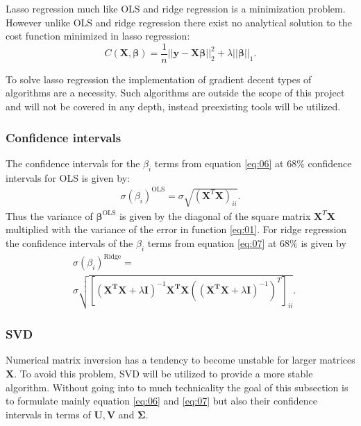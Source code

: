 \documentclass[uio,jmp,amsmath,amssymb,reprint,nofootinbib]{revtex4-1}
\numberwithin{equation}{section}
\newcommand{\lp}{\left(}
\newcommand{\rp}{\right)}
\newcommand{\lsb}{\left[}
\newcommand{\rsb}{\right]}
\begin{document}
Lasso regression much like OLS and ridge regression is a minimization problem. However unlike OLS and ridge regression there exist no analytical solution to the cost function minimized in lasso regression:
\begin{equation}
C(\boldsymbol{X},\boldsymbol{\beta})=\frac{1}{n}\vert\vert \boldsymbol{y}-\boldsymbol{X}\boldsymbol{\beta}\vert\vert_2^2+\lambda\vert\vert \boldsymbol{\beta}\vert\vert_1.
\end{equation}

To solve lasso regression the implementation of gradient decent types of algorithms are a necessity. Such algorithms are outside the scope of this project and will not be covered in any depth, instead preexisting tools will be utilized.

\subsubsection{Confidence intervals}

The confidence intervals for the \(\beta_i\) terms from equation \ref{eq:06} at \(68\%\) confidence intervals for OLS is given by:
\begin{align}\label{eq:12}
\sigma(\beta_i)^{\text{OLS}} = \sigma\sqrt{(\bm{X}^T\bm{X})_{ii}}.
\end{align}
Thus the variance of \(\bm{\beta}^{\text{OLS}}\) is given by the diagonal of the square matrix \(\bm{X}^T\bm{X}\) multiplied with the variance of the error in function \ref{eq:01}. For ridge regression the confidence intervals of the \(\beta_i\) terms from equation \ref{eq:07} at \(68\%\) is given by
\begin{align*}
&\sigma(\beta_i)^{\text{Ridge}} = \\
&\sigma\sqrt{ \lsb\lp\bm{X^TX} + \lambda\bm{I}\rp^{-1}\bm{X^TX}\lp\lp\bm{X^TX} + \lambda\bm{I}\rp^{-1}\rp^T\rsb_{ii} }.
\end{align*}

\subsubsection{SVD}

Numerical matrix inversion has a tendency to become unstable for larger matrices \(\bm{X}\). To avoid this problem, SVD will be utilized to provide a more stable algorithm. Without going into to much technicality the goal of this subsection is to formulate mainly equation \ref{eq:06} and \ref{eq:07} but also their confidence intervals in terms of \(\bm{U, V}\) and \(\bm{\Sigma}\).
\end{document}
